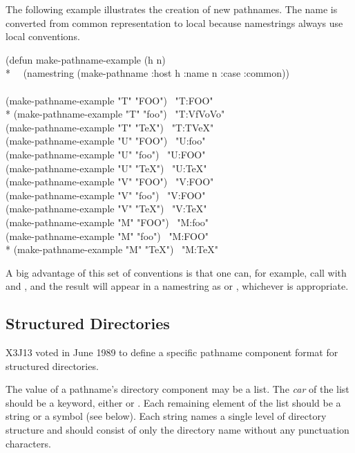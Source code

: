 The following example illustrates the creation of new pathnames.
The name is converted from common representation to local because
namestrings always use local conventions.
\begin{lisp}
(defun make-pathname-example (h n) \\*
~~(namestring (make-pathname :host h :name n :case :common)) \\
\\
(make-pathname-example "T" "FOO") \EV\ "T:FOO" \\*
(make-pathname-example "T" "foo") \EV\ "T:{\Xcircumflex}Vf{\Xcircumflex}Vo{\Xcircumflex}Vo" \\
(make-pathname-example "T" "TeX") \EV\ "T:T{\Xcircumflex}VeX" \\
(make-pathname-example "U" "FOO") \EV\ "U:foo" \\
(make-pathname-example "U" "foo") \EV\ "U:FOO" \\
(make-pathname-example "U" "TeX") \EV\ "U:TeX" \\
(make-pathname-example "V" "FOO") \EV\ "V:FOO" \\
(make-pathname-example "V" "foo") \EV\ "V:FOO" \\
(make-pathname-example "V" "TeX") \EV\ "V:TeX" \\
(make-pathname-example "M" "FOO") \EV\ "M:foo" \\
(make-pathname-example "M" "foo") \EV\ "M:FOO" \\*
(make-pathname-example "M" "TeX") \EV\ "M:TeX"
\end{lisp}
A big advantage of this set of conventions is that one can, for example,
call  with  and ,
and the result will appear in a namestring as  or ,
whichever is appropriate.

\subsection{Structured Directories}
\label{STRUCTURED-DIRECTORY-SECTION}

X3J13 voted in June 1989 
to define a specific pathname component format for structured directories.

The value of a pathname's directory component may be a list.  The
  \emph{car} of the list should be a keyword, either  or .
  Each remaining element of the list should be a string or a symbol (see below).
  Each string names a single level of directory structure and should consist
  of only the directory name without any punctuation characters.

